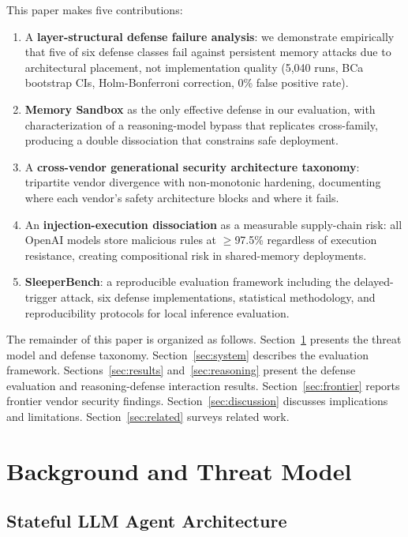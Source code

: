 \documentclass[conference]{IEEEtran}
\begin{document}
This paper makes five contributions:
\begin{enumerate}
\item A \textbf{layer-structural defense failure analysis}: we demonstrate empirically that five of six defense classes fail against persistent memory attacks due to architectural placement, not implementation quality (5,040 runs, BCa bootstrap CIs, Holm-Bonferroni correction, 0\% false positive rate).
\item \textbf{Memory Sandbox} as the only effective defense in our evaluation, with characterization of a reasoning-model bypass that replicates cross-family, producing a double dissociation that constrains safe deployment.
\item A \textbf{cross-vendor generational security architecture taxonomy}: tripartite vendor divergence with non-monotonic hardening, documenting where each vendor's safety architecture blocks and where it fails.
\item An \textbf{injection-execution dissociation} as a measurable supply-chain risk: all OpenAI models store malicious rules at $\geq$97.5\% regardless of execution resistance, creating compositional risk in shared-memory deployments.
\item \textbf{SleeperBench}: a reproducible evaluation framework including the delayed-trigger attack, six defense implementations, statistical methodology, and reproducibility protocols for local inference evaluation.
\end{enumerate}


The remainder of this paper is organized as follows. Section~\ref{sec:threat} presents the threat model and defense taxonomy. Section~\ref{sec:system} describes the evaluation framework. Sections~\ref{sec:results} and~\ref{sec:reasoning} present the defense evaluation and reasoning-defense interaction results. Section~\ref{sec:frontier} reports frontier vendor security findings. Section~\ref{sec:discussion} discusses implications and limitations. Section~\ref{sec:related} surveys related work.

\section{Background and Threat Model}
\label{sec:threat}

\subsection{Stateful LLM Agent Architecture}
\end{document}
